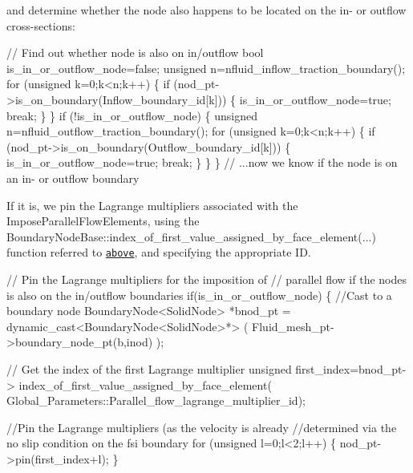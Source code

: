 and determine whether the node also happens to be located on the in-\/ or outflow cross-\/sections\+:


\begin{DoxyCodeInclude}
     
     \textcolor{comment}{// Find out whether node is also on in/outflow}
     \textcolor{keywordtype}{bool} is\_in\_or\_outflow\_node=\textcolor{keyword}{false};
     \textcolor{keywordtype}{unsigned} n=nfluid\_inflow\_traction\_boundary();
     \textcolor{keywordflow}{for} (\textcolor{keywordtype}{unsigned} k=0;k<n;k++)
      \{
       \textcolor{keywordflow}{if} (nod\_pt->is\_on\_boundary(Inflow\_boundary\_id[k]))
        \{
         is\_in\_or\_outflow\_node=\textcolor{keyword}{true};
         \textcolor{keywordflow}{break};
        \}
      \}
     \textcolor{keywordflow}{if} (!is\_in\_or\_outflow\_node)
      \{
       \textcolor{keywordtype}{unsigned} n=nfluid\_outflow\_traction\_boundary();
       \textcolor{keywordflow}{for} (\textcolor{keywordtype}{unsigned} k=0;k<n;k++)
        \{
         \textcolor{keywordflow}{if} (nod\_pt->is\_on\_boundary(Outflow\_boundary\_id[k]))
          \{
           is\_in\_or\_outflow\_node=\textcolor{keyword}{true};
           \textcolor{keywordflow}{break};
          \}
        \}
      \} \textcolor{comment}{// ...now we know if the node is on an in- or outflow boundary}

\end{DoxyCodeInclude}


If it is, we pin the Lagrange multipliers associated with the {\ttfamily Impose\+Parallel\+Flow\+Elements}, using the {\ttfamily Boundary\+Node\+Base\+::index\+\_\+of\+\_\+first\+\_\+value\+\_\+assigned\+\_\+by\+\_\+face\+\_\+element}(...) function referred to \href{#face}{\tt above}, and specifying the appropriate ID.


\begin{DoxyCodeInclude}
     
     \textcolor{comment}{// Pin the Lagrange multipliers for the imposition of}
     \textcolor{comment}{// parallel flow if the nodes is also on the in/outflow boundaries}
     \textcolor{keywordflow}{if}(is\_in\_or\_outflow\_node)
      \{
       \textcolor{comment}{//Cast to a boundary node}
       BoundaryNode<SolidNode> *bnod\_pt = 
        \textcolor{keyword}{dynamic\_cast<}BoundaryNode<SolidNode>*\textcolor{keyword}{>}
        ( Fluid\_mesh\_pt->boundary\_node\_pt(b,inod) );
       
       \textcolor{comment}{// Get the index of the first Lagrange multiplier}
       \textcolor{keywordtype}{unsigned} first\_index=bnod\_pt->
        index\_of\_first\_value\_assigned\_by\_face\_element(
         Global\_Parameters::Parallel\_flow\_lagrange\_multiplier\_id);

       \textcolor{comment}{//Pin the Lagrange multipliers (as the velocity is already}
       \textcolor{comment}{//determined via the no slip condition on the fsi boundary}
       \textcolor{keywordflow}{for} (\textcolor{keywordtype}{unsigned} l=0;l<2;l++)
        \{
         nod\_pt->pin(first\_index+l);
        \}

\end{DoxyCodeInclude}


